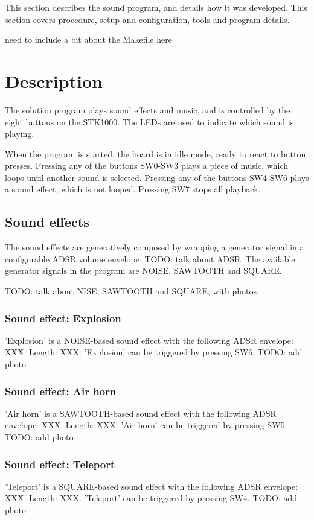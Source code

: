 
This section describes the sound program, and details how it was developed. This section covers procedure, setup and configuration, tools and program details.

need to include a bit about the Makefile here


\section{Description}

The solution program plays sound effects and music, and is controlled by the eight buttons on the STK1000.
The LEDs are used to indicate which sound is playing.

When the program is started, the board is in idle mode, ready to react to button presses.
Pressing any of the buttons SW0-SW3 plays a piece of music, which loops until another sound is selected.
Pressing any of the buttons SW4-SW6 plays a sound effect, which is not looped.
Pressing SW7 stops all playback.

\subsection{Sound effects}

The sound effects are generatively composed by wrapping a generator signal in a configurable ADSR volume envelope.
TODO: talk about ADSR.
The available generator signals in the program are NOISE, SAWTOOTH and SQUARE.

TODO: talk about NISE, SAWTOOTH and SQUARE, with photos.

\subsubsection{Sound effect: Explosion}

'Explosion' is a NOISE-based sound effect with the following ADSR envelope: XXX.
Length: XXX.
'Explosion' can be triggered by pressing SW6.
TODO: add photo

\subsubsection{Sound effect: Air horn}
'Air horn' is a SAWTOOTH-based sound effect with the following ADSR envelope: XXX.
Length: XXX.
'Air horn' can be triggered by pressing SW5.
TODO: add photo

\subsubsection{Sound effect: Teleport}
'Teleport' is a SQUARE-based sound effect with the following ADSR envelope: XXX.
Length: XXX.
'Teleport' can be triggered by pressing SW4.
TODO: add photo


